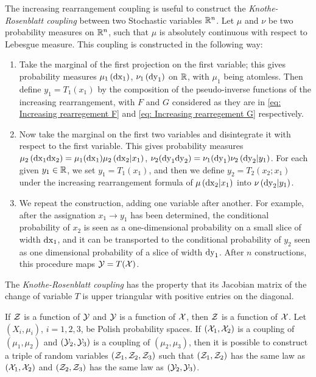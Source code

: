 The increasing rearrangement coupling is useful to construct the \textit{Knothe-Rosenblatt coupling} between two Stochastic variables $\mathbb{R}^n$. Let $\mu$ and $\nu$ be two probability measures on $\mathbb{R}^n$, such that $\mu$ is absolutely continuous with respect to Lebesgue measure. This coupling is constructed in the following way:

\begin{enumerate}
	\item Take the marginal of the first projection on the first variable; this gives probability measures $\mu_1\left( \mathrm{dx}_1 \right)$, $\nu_1\left( \mathrm{dy}_1 \right)$ on $\mathbb{R}$, with $\mu_1$ being atomless. Then define $y_1=T_1(x_1)$ by the composition of the pseudo-inverse functions of the increasing rearrangement, with $F$ and $G$ considered as they are in \eqref{eq: Increasing rearregement F} and \eqref{eq: Increasing rearregement G} respectively.
	
	\item Now take the marginal on the first two variables and disintegrate it with respect to the first variable. This gives probability measures $\mu_2\left( \mathrm{dx}_1\mathrm{dx}_2 \right)=\mu_1(\mathrm{dx}_1)\mu_2\left( \mathrm{dx}_2 |x_1 \right)$, $\nu_2 (\mathrm{dy}_1\mathrm{dy}_2)=\nu_1(\mathrm{dy}_1)\nu_2\left( \mathrm{dy}_2|y_1 \right)$. For each given $y_1\in \mathbb{R}$, we set $y_1=T_1(x_1)$, and then we define $y_2=T_2(x_2; x_1)$ under the increasing rearrangement formula of $\mu\left( \mathrm{dx}_2| x_1 \right)$ into $\nu\left( \mathrm{dy}_2| y_1 \right)$.
	
	\item We repeat the construction, adding one variable after another. For example, after the assignation $x_1\rightarrow y_1$ has been determined, the conditional probability of $x_2$ is seen as a one-dimensional probability on a small slice of width $\mathrm{dx}_1$, and it can be transported to the conditional probability of $y_2$ seen as one dimensional probability of a slice of width $\mathrm{dy}_1$. After $n$ constructions, this procedure maps $\mathcal{Y}=T(\mathcal{X})$.
\end{enumerate} 

The \textit{Knothe-Rosenblatt coupling} has the property that its Jacobian matrix of the change of variable $T$ is upper triangular with positive entries on the diagonal. 	


\begin{lemma} If $\mathcal{Z}$ is a function of $\mathcal{Y}$ and $\mathcal{Y}$ is a function of $\mathcal{X}$, then $\mathcal{Z}$ is a function of $\mathcal{X}$. Let $(X_i , \mu_i)$, $i = 1, 2, 3$,  be Polish probability spaces. If $(\mathcal{X}_1 , \mathcal{X}_2)$ is a coupling of $(\mu_1, \mu_2 )$ and $(\mathcal{Y}_2 , \mathcal{Y}_3)$ is a coupling of $(\mu_2, \mu_3)$, then it is possible to construct a triple of random variables $(\mathcal{Z}_1 , \mathcal{Z}_2, \mathcal{Z}_3)$ such that $(\mathcal{Z}_1, \mathcal{Z}_2)$ has the same law as $(\mathcal{X}_1 ,\mathcal{X}_2)$ and $(\mathcal{Z}_2, \mathcal{Z}_3)$ has the same law as $(\mathcal{Y}_2, \mathcal{Y}_3)$.
\end{lemma}


